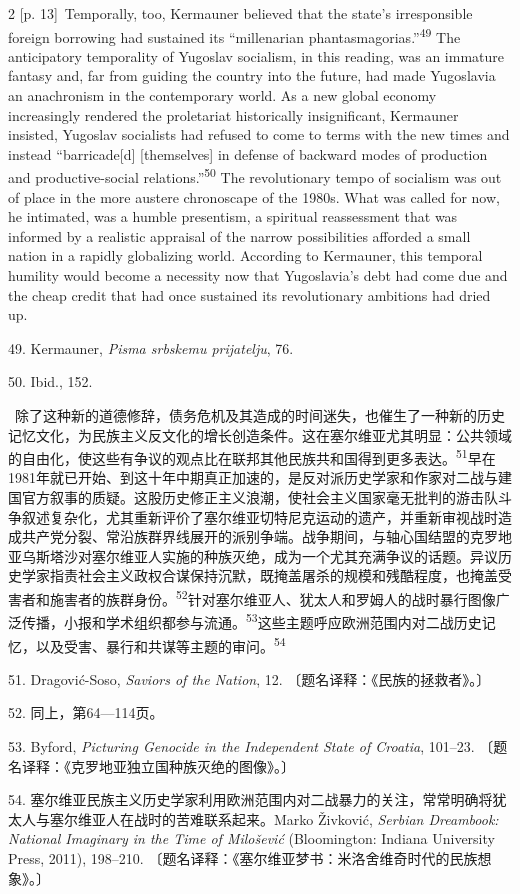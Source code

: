 \documentclass[10pt,a4paper]{article}
\begin{document}
\begin{paracol}{2}
\switchcolumn
{\scriptsize\color{gray} [p. 13]}\ Temporally, too, Kermauner believed that the state’s irresponsible foreign borrowing had sustained its “millenarian phantasmagorias.”\nobreak\textsuperscript{49} The anticipatory temporality of Yugoslav socialism, in this reading, was an immature fantasy and, far from guiding the country into the future, had made Yugoslavia an anachronism in the contemporary world. As a new global economy increasingly rendered the proletariat historically insignificant, Kermauner insisted, Yugoslav socialists had refused to come to terms with the new times and instead “barricade[d] [themselves] in defense of backward modes of production and productive-social relations.”\nobreak\textsuperscript{50} The revolutionary tempo of socialism was out of place in the more austere chronoscape of the 1980s. What was called for now, he intimated, was a humble presentism, a spiritual reassessment that was informed by a realistic appraisal of the narrow possibilities afforded a small nation in a rapidly globalizing world. According to Kermauner, this temporal humility would become a necessity now that Yugoslavia’s debt had come due and the cheap credit that had once sustained its revolutionary ambitions had dried up.\par{\small 49. Kermauner, \textit{Pisma srbskemu prijatelju}, 76.\par}{\small 50. Ibid., 152.\par}
\switchcolumn*
{\scriptsize\color{gray} [p. 14]}\ 除了这种新的道德修辞，债务危机及其造成的时间迷失，也催生了一种新的历史记忆文化，为民族主义反文化的增长创造条件。这在塞尔维亚尤其明显：公共领域的自由化，使这些有争议的观点比在联邦其他民族共和国得到更多表\mbox{达。\textsuperscript{51}}早在1981年就已开始、到这十年中期真正加速的，是反对派历史学家和作家对二战与建国官方叙事的质疑。这股历史修正主义浪潮，使社会主义国家毫无批判的游击队斗争叙述复杂化，尤其重新评价了塞尔维亚切特尼克运动的遗产，并重新审视战时造成共产党分裂、常沿族群界线展开的派别争端。战争期间，与轴心国结盟的克罗地亚乌斯塔沙对塞尔维亚人实施的种族灭绝，成为一个尤其充满争议的话题。异议历史学家指责社会主义政权合谋保持沉默，既掩盖屠杀的规模和残酷程度，也掩盖受害者和施害者的族群身\mbox{份。\textsuperscript{52}}针对塞尔维亚人、犹太人和罗姆人的战时暴行图像广泛传播，小报和学术组织都参与流\mbox{通。\textsuperscript{53}}这些主题呼应欧洲范围内对二战历史记忆，以及受害、暴行和共谋等主题的审\mbox{问。\textsuperscript{54}}\par{\small 51. Dragović-Soso, \textit{Saviors of the Nation}, 12. 〔题名译释：《民族的拯救者》。〕\par}{\small 52. 同上，第64—114页。\par}{\small 53. Byford, \textit{Picturing Genocide in the Independent State of Croatia}, 101–23. 〔题名译释：《克罗地亚独立国种族灭绝的图像》。〕\par}{\small 54. 塞尔维亚民族主义历史学家利用欧洲范围内对二战暴力的关注，常常明确将犹太人与塞尔维亚人在战时的苦难联系起来。Marko Živković, \textit{Serbian Dreambook: National Imaginary in the Time of Milošević} (Bloomington: Indiana University Press, 2011), 198–210. 〔题名译释：《塞尔维亚梦书：米洛舍维奇时代的民族想象》。〕\par}

\end{paracol}
\end{document}

